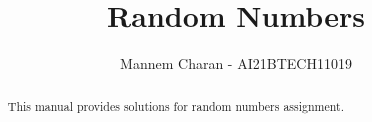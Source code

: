 \documentclass[journal,12pt,twocolumn]{IEEEtran}
\renewcommand\thesection{\arabic{section}}
\begin{document}
\DeclarePairedDelimiter{\ceil}{\lceil}{\rceil}
\makeatletter
{}
\makeatother
\let\StandardTheFigure\thefigure
\renewcommand{\thefigure}{\thesection}
\makeatletter
{}
\makeatother
\let\StandardTheFigure\thefigure
\let\StandardTheTable\thetable
\let\vec\mathbf
{}
\vspace{3cm}
\title{%
	Random Numbers
}
%
%
%
\author{Mannem Charan - AI21BTECH11019}
\maketitle
\tableofcontents
\bigskip
\renewcommand{\thefigure}{\theenumi}
\renewcommand{\thetable}{\theenumi}

\begin{abstract}
This manual provides solutions for random numbers assignment.
\end{abstract}
\end{document}
